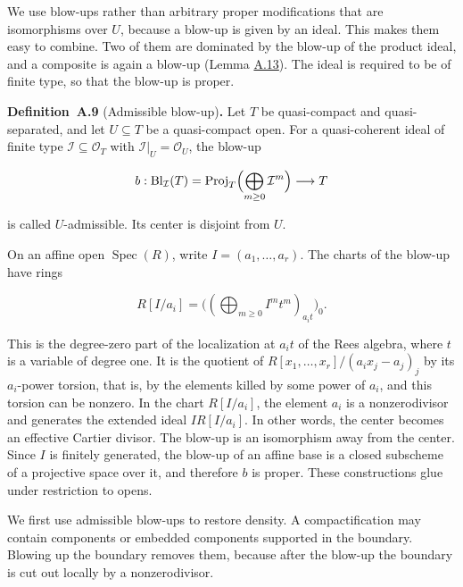 \documentclass[11pt]{article}
\newenvironment{bpstatement}[2]{\par\addvspace{0.6\baselineskip}\noindent\textbf{#1}#2\textbf{.}\enspace\ignorespaces}
  {\par\addvspace{0.4\baselineskip}}
\begin{document}
We use blow-ups rather than arbitrary proper modifications that are isomorphisms over \(U\), because a blow-up is given by an ideal. This makes them easy to combine. Two of them are dominated by the blow-up of the product ideal, and a composite is again a blow-up (Lemma \hyperref[bp33]{A.13}). The ideal is required to be of finite type, so that the blow-up is proper.

\label{bp25}%
\begin{bpstatement}{Definition~A.9}{ (Admissible blow-up)}
Let \(T\) be quasi-compact and quasi-separated, and let \(U\subseteq T\) be a quasi-compact open. For a quasi-coherent ideal of finite type \(\mathcal I\subseteq\mathcal O_T\) with \(\mathcal I|_U=\mathcal O_U\), the blow-up

\[
b:\operatorname{Bl}_{\mathcal I}(T)=
\operatorname{Proj}_T\Bigl(\bigoplus_{m\geq0}\mathcal I^m\Bigr)
\longrightarrow T
\]

is called \(U\)-admissible. Its center is disjoint from \(U\).
\end{bpstatement}

\label{bp26}%
On an affine open \(\operatorname{Spec}(R)\), write \(I=(a_1,\ldots,a_r)\). The charts of the blow-up have rings

\[
R[I/a_i]=\bigl((\bigoplus_{m\geq0}I^mt^m)_{a_it}\bigr)_0.
\]

This is the degree-zero part of the localization at \(a_it\) of the Rees algebra, where \(t\) is a variable of degree one. It is the quotient of \(R[x_1,\ldots,x_r]/(a_ix_j-a_j)_j\) by its \(a_i\)-power torsion, that is, by the elements killed by some power of \(a_i\), and this torsion can be nonzero. In the chart \(R[I/a_i]\), the element \(a_i\) is a nonzerodivisor and generates the extended ideal \(IR[I/a_i]\). In other words, the center becomes an effective Cartier divisor. The blow-up is an isomorphism away from the center. Since \(I\) is finitely generated, the blow-up of an affine base is a closed subscheme of a projective space over it, and therefore \(b\) is proper. These constructions glue under restriction to opens.

We first use admissible blow-ups to restore density. A compactification may contain components or embedded components supported in the boundary. Blowing up the boundary removes them, because after the blow-up the boundary is cut out locally by a nonzerodivisor.
\end{document}
